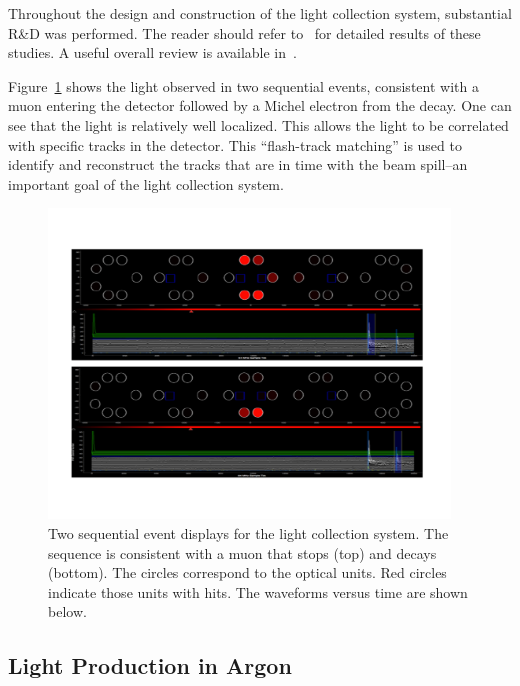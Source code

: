 Throughout the design and construction of the light collection system,  substantial R\&D was performed.   The reader should refer to~\cite{Jones:2013bca,Bugel:2011xg,Katori:2011uq,Chiu:2012,Baptista:2012,Briese:2013wua,Jones:2013mfa,Katori:2013wqa,Moss:2014ota,Conrad:2015xta,Moss:2015hha} for detailed results of these studies.    A useful overall review is available in~\cite{Jones:2015bya}. 

Figure~\ref{fig:muondecaylight} shows the light observed in two sequential events, consistent with a muon entering the detector followed by a Michel electron from the decay.   One can see that the light is relatively well localized.   This allows the light to be correlated with specific tracks in the detector.  This ``flash-track matching'' is used to identify and reconstruct the tracks that are in time with the beam spill--an important goal of the light collection system.

\begin{figure}
	\centering
    \includegraphics[width=0.95\textwidth]{./figures/muondecay.pdf} 
    \caption{Two sequential event displays for the light collection system.  The sequence is consistent with a muon that stops (top) and decays (bottom).  The circles correspond to the optical units. Red circles indicate those units with hits.    The waveforms versus time are shown below.}\label{fig:muondecaylight}
\end{figure}


\subsection{Light Production in Argon \label{sint}}


